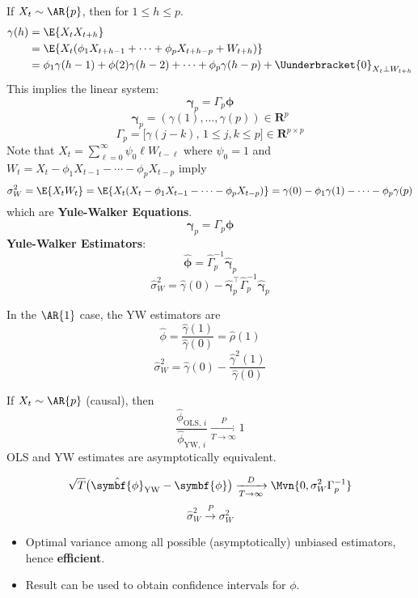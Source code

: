 If $ X_t \sim \AR{p} $, then for $ 1\le h\le p $.
\begin{align*}
    \gamma(h)
     & =\E{X_{t}X_{t+h}}                                                                                   \\
     & =\E{X_t(\phi_1 X_{t+h-1}+\cdots+\phi_p X_{t+h-p}+W_{t+h})}                                          \\
     & =\phi_1\gamma(h-1)+\phi(2)\gamma(h-2)+\cdots+\phi_p\gamma(h-p)+\Uunderbracket{0}_{X_t\perp W_{t+h}}
\end{align*}
This implies the linear system:
\[ \symbf{\gamma}_p=\Gamma_p \symbf{\phi} \]
\[ \symbf{ \gamma}_p=(\gamma(1),\ldots,\gamma(p))\in\mathbf{R}^p \]
\[  \Gamma_p=\bigl[\gamma(j-k),\, 1\le j,k\le p\bigr]\in\mathbf{R}^{p\times p} \]
Note that $ X_t=\sum_{\ell=0}^{\infty} \psi_0\ell W_{t-\ell} $ where $ \psi_0=1 $
and $ W_t=X_t-\phi_1X_{t-1}-\cdots-\phi_p X_{t-p} $ imply
\[ \sigma_W^2=\E{X_t W_t}
    =\E{X_t(X_t-\phi_1 X_{t-1}-\cdots-\phi_p X_{t-p})}
    =\gamma(0)-\phi_1\gamma(1)-\cdots-\phi_p\gamma(p) \]
which are \textbf{Yule-Walker Equations}.
\[ \symbf{\gamma}_p=\Gamma_p \symbf{\phi} \]
\textbf{Yule-Walker Estimators}:
\[ \hat{\symbf{\phi}}=\hat{\Gamma}_p^{-1} \symbf{\hat{\gamma}}_p \]
\[ \hat{\sigma}_W^2=\hat{\gamma}(0)-\hat{\symbf{\gamma}}_p^\top \hat{\Gamma}_p^{-1}\hat{\symbf{\gamma}}_p \]
\begin{Example}{}{}
    In the $ \AR{1} $ case, the YW estimators are
    \[ \hat{\phi}=\frac{\hat{\gamma}(1)}{\hat{\gamma}(0)}=\hat{\rho}(1)  \]
    \[ \hat{\sigma}_W^2=\hat{\gamma}(0)-\frac{\hat{\gamma}^2(1)}{\hat{\gamma}(0)}  \]
\end{Example}
\begin{Theorem}{}{}
    If $ X_t \sim \AR{p} $ (causal), then
    \[ \frac{\hat{\phi}_{\text{OLS, $i$}}}{\hat{\phi}_{\text{YW, $i$}}}
        \xrightarrow[T\to\infty]{P}1  \]
    OLS and YW estimates are asymptotically equivalent.
\end{Theorem}
\begin{Theorem}{}{}
    \[ \sqrt{T}\bigl(\hat{\symbf{\phi}}_{\text{YW}}-\symbf{\phi}\bigr)
        \xrightarrow[T\to\infty]{D}\Mvn{0,\sigma_W^2\Gamma_p^{-1}} \]
    \[ \hat{\sigma}_W^2\xrightarrow{P}\sigma_W^2 \]
    \begin{itemize}
        \item Optimal variance among all possible (asymptotically) unbiased estimators, hence \textbf{efficient}.
        \item Result can be used to obtain confidence intervals for $ \phi $.
    \end{itemize}
\end{Theorem}

